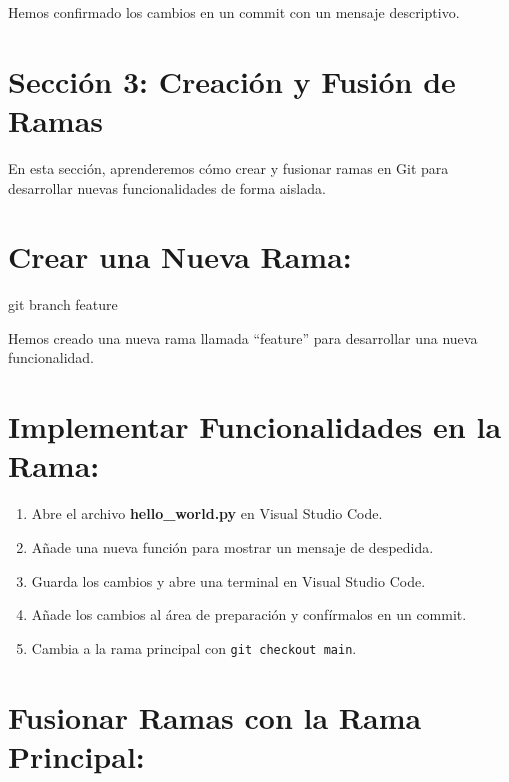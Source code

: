 \documentclass[
  a4paper,
  DIV=11,
  numbers=noendperiod,
  onepage,
  openany]{scrreprt}
\newenvironment{Shaded}{\begin{snugshade}}{\end{snugshade}}
\newcommand{\FunctionTok}[1]{\textcolor[rgb]{0.28,0.35,0.67}{#1}}
\newcommand{\NormalTok}[1]{\textcolor[rgb]{0.00,0.23,0.31}{#1}}
\providecommand{\tightlist}{%
  \setlength{\itemsep}{0pt}\setlength{\parskip}{0pt}}\usepackage{longtable,booktabs,array}
\begin{document}
Hemos confirmado los cambios en un commit con un mensaje descriptivo.

\section{Sección 3: Creación y Fusión de
Ramas}\label{secciuxf3n-3-creaciuxf3n-y-fusiuxf3n-de-ramas}

En esta sección, aprenderemos cómo crear y fusionar ramas en Git para
desarrollar nuevas funcionalidades de forma aislada.

\section{Crear una Nueva Rama:}\label{crear-una-nueva-rama}

\begin{Shaded}
\begin{Highlighting}[]
\FunctionTok{git}\NormalTok{ branch feature}
\end{Highlighting}
\end{Shaded}

Hemos creado una nueva rama llamada ``feature'' para desarrollar una
nueva funcionalidad.

\section{Implementar Funcionalidades en la
Rama:}\label{implementar-funcionalidades-en-la-rama}

\begin{enumerate}
\def\labelenumi{\arabic{enumi}.}
\tightlist
\item
  Abre el archivo \textbf{hello\_world.py} en Visual Studio Code.
\item
  Añade una nueva función para mostrar un mensaje de despedida.
\item
  Guarda los cambios y abre una terminal en Visual Studio Code.
\item
  Añade los cambios al área de preparación y confírmalos en un commit.
\item
  Cambia a la rama principal con \texttt{git\ checkout\ main}.
\end{enumerate}

\section{Fusionar Ramas con la Rama
Principal:}\label{fusionar-ramas-con-la-rama-principal}
\end{document}
